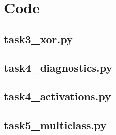 \documentclass[10pt,a4paper]{article}
\begin{document}
\section*{Code}
\subsection*{task3\_xor.py}
\subsection*{task4\_diagnostics.py}
\subsection*{task4\_activations.py}
\subsection*{task5\_multiclass.py}
\end{document}
